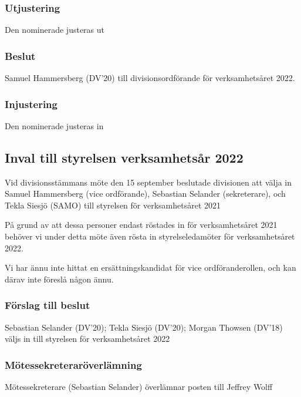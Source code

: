 \documentclass[protokoll]{dvd}
\begin{document}
        \subsubsection*{Utjustering}
        Den nominerade justeras ut

        \subsubsection*{Beslut}
            \begin{attsatser}
                \item Samuel Hammersberg (DV'20) till divisionsordförande för verksamhetsåret 2022.
            \end{attsatser}

        \subsubsection*{Injustering}
        Den nominerade justeras in

\subsection{Inval till styrelsen verksamhetsår 2022}

Vid divisionsstämmans möte den 15 september beslutade divisionen att välja in Samuel Hammersberg (vice ordförande), Sebastian Selander (sekreterare), och Tekla Siesjö (SAMO) till styrelsen för verksamhetsåret 2021

På grund av att dessa personer endast röstades in för verksamhetsåret 2021 behöver vi under detta möte även rösta in styrelseledamöter för verksamhetsåret 2022.

Vi har ännu inte hittat en ersättningskandidat för vice ordföranderollen, och kan därav inte föreslå någon ännu.


        \subsubsection*{Förslag till beslut}
        \begin{attsatser}
            \item Sebastian Selander (DV'20); Tekla Siesjö (DV'20); Morgan Thowsen (DV'18) väljs in till styrelsen för verksamhetsåret 2022
        \end{attsatser}

        \subsubsection*{Mötessekreteraröverlämning}
        Mötessekreterare (Sebastian Selander) överlämnar posten till Jeffrey Wolff
\end{document}
